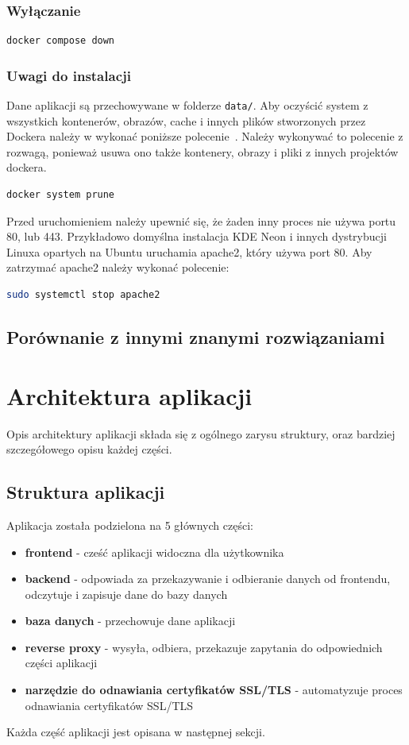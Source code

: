 \documentclass[shortabstract]{iithesis}
\begin{document}
\subsection{Wyłączanie}
\begin{lstlisting}[language=bash]
docker compose down
\end{lstlisting}

\subsection{Uwagi do instalacji}
Dane aplikacji są przechowywane w folderze \texttt{data/}.
Aby oczyścić system z wszystkich kontenerów, obrazów, cache i innych plików stworzonych przez Dockera należy w wykonać poniższe polecenie~\cite{DockerPrune}.
Należy wykonywać to polecenie z rozwagą, ponieważ usuwa ono także kontenery, obrazy i pliki z innych projektów dockera.
\begin{lstlisting}[language=bash]
docker system prune
\end{lstlisting}
Przed uruchomieniem należy upewnić się, że żaden inny proces nie używa portu 80, lub 443.
Przykładowo domyślna instalacja KDE Neon i innych dystrybucji Linuxa opartych na Ubuntu uruchamia apache2, który używa port 80.
Aby zatrzymać apache2 należy wykonać polecenie:
\begin{lstlisting}[language=bash]
sudo systemctl stop apache2
\end{lstlisting}

\section{Porównanie z innymi znanymi rozwiązaniami}

\chapter{Architektura aplikacji}
Opis architektury aplikacji składa się z ogólnego zarysu struktury, oraz bardziej szczegółowego opisu każdej części.
\section{Struktura aplikacji}
Aplikacja została podzielona na 5 głównych części:
\begin{itemize}
    \item \textbf{frontend} - cześć aplikacji widoczna dla użytkownika
    \item \textbf{backend} - odpowiada za przekazywanie i odbieranie danych od frontendu, odczytuje i zapisuje dane do bazy danych
    \item \textbf{baza danych} - przechowuje dane aplikacji
    \item \textbf{reverse proxy} - wysyła, odbiera, przekazuje zapytania do odpowiednich części aplikacji
    \item \textbf{narzędzie do odnawiania certyfikatów SSL/TLS} - automatyzuje proces odnawiania certyfikatów SSL/TLS
\end{itemize}
Każda część aplikacji jest opisana w następnej sekcji.
\end{document}
